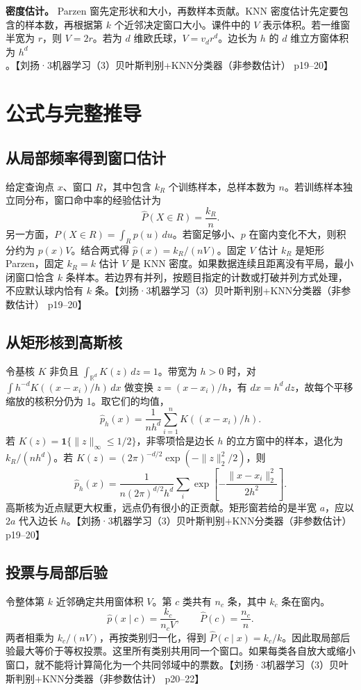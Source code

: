 \documentclass[UTF8,a4paper,zihao=-4,fontset=fandol]{ctexrep}
\begin{document}
\textbf{密度估计。} Parzen 窗先定形状和大小，再数样本贡献。KNN 密度估计先定要包含的样本数，再根据第 $k$ 个近邻决定窗口大小。课件中的 $V$ 表示体积。若一维窗半宽为 $r$，则 $V=2r$。若为 $d$ 维欧氏球，$V=v_dr^d$。边长为 $h$ 的 $d$ 维立方窗体积为 $h^d$。【刘扬·3机器学习（3）贝叶斯判别+KNN分类器（非参数估计） p19–20】

\section{公式与完整推导}
\subsection*{从局部频率得到窗口估计}
给定查询点 $x$、窗口 $R$，其中包含 $k_R$ 个训练样本，总样本数为 $n$。若训练样本独立同分布，窗口命中率的经验估计为
\[
 \widehat P(X\in R)=\frac{k_R}{n}.
\]
另一方面，$P(X\in R)=\int_Rp(u)\,du$。若窗足够小、$p$ 在窗内变化不大，则积分约为 $p(x)V$。结合两式得 $\widehat p(x)=k_R/(nV)$。固定 $V$ 估计 $k_R$ 是矩形 Parzen，固定 $k_R=k$ 估计 $V$ 是 KNN 密度。如果数据连续且距离没有平局，最小闭窗口恰含 $k$ 条样本。若边界有并列，按题目指定的计数或打破并列方式处理，不应默认球内恰有 $k$ 条。【刘扬·3机器学习（3）贝叶斯判别+KNN分类器（非参数估计） p19–20】

\subsection*{从矩形核到高斯核}
令基核 $K$ 非负且 $\int_{\mathbb R^d}K(z)\,dz=1$。带宽为 $h>0$ 时，对 $\int h^{-d}K((x-x_i)/h)\,dx$ 做变换 $z=(x-x_i)/h$，有 $dx=h^d\,dz$，故每个平移缩放的核积分仍为 1。取它们的均值，
\[
 \widehat p_h(x)=\frac{1}{nh^d}\sum_{i=1}^nK((x-x_i)/h).
\]
若 $K(z)=\mathbf 1\{\|z\|_\infty\le1/2\}$，非零项恰是边长 $h$ 的立方窗中的样本，退化为 $k_R/(nh^d)$。若 $K(z)=(2\pi)^{-d/2}\exp(-\|z\|_2^2/2)$，则
\[
 \widehat p_h(x)=\frac1{n(2\pi)^{d/2}h^d}
 \sum_i\exp\!\left[-\frac{\|x-x_i\|_2^2}{2h^2}\right].
\]
高斯核为近点赋更大权重，远点仍有很小的正贡献。矩形窗若给的是半宽 $a$，应以 $2a$ 代入边长 $h$。【刘扬·3机器学习（3）贝叶斯判别+KNN分类器（非参数估计） p19–20】

\subsection*{投票与局部后验}
令整体第 $k$ 近邻确定共用窗体积 $V$。第 $c$ 类共有 $n_c$ 条，其中 $k_c$ 条在窗内。
\[
 \widehat p(x\mid c)=\frac{k_c}{n_c V},\qquad
 \widehat P(c)=\frac{n_c}{n}.
\]
两者相乘为 $k_c/(nV)$，再按类别归一化，得到 $\widehat P(c\mid x)=k_c/k$。因此取局部后验最大等价于等权投票。这里所有类别共用同一个窗口。如果每类各自放大或缩小窗口，就不能将计算简化为一个共同邻域中的票数。【刘扬·3机器学习（3）贝叶斯判别+KNN分类器（非参数估计） p20–22】
\end{document}

